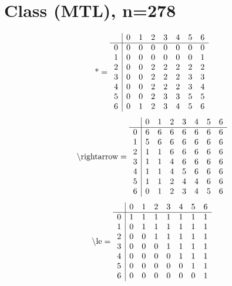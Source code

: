 \documentclass[11pt]{article}
\begin{document}
\section{Class (MTL), n=278}
\[\text{*} = 
\begin{array}{r | r r r r r r r}
 & 0 & 1 & 2 & 3 & 4 & 5 & 6 \\ \hline
0 & 0 & 0 & 0 & 0 & 0 & 0 & 0 \\
1 & 0 & 0 & 0 & 0 & 0 & 0 & 1 \\
2 & 0 & 0 & 2 & 2 & 2 & 2 & 2 \\
3 & 0 & 0 & 2 & 2 & 2 & 3 & 3 \\
4 & 0 & 0 & 2 & 2 & 2 & 3 & 4 \\
5 & 0 & 0 & 2 & 3 & 3 & 5 & 5 \\
6 & 0 & 1 & 2 & 3 & 4 & 5 & 6 \\
\end{array}
\]
\[\text{\textbackslash rightarrow} = 
\begin{array}{r | r r r r r r r}
 & 0 & 1 & 2 & 3 & 4 & 5 & 6 \\ \hline
0 & 6 & 6 & 6 & 6 & 6 & 6 & 6 \\
1 & 5 & 6 & 6 & 6 & 6 & 6 & 6 \\
2 & 1 & 1 & 6 & 6 & 6 & 6 & 6 \\
3 & 1 & 1 & 4 & 6 & 6 & 6 & 6 \\
4 & 1 & 1 & 4 & 5 & 6 & 6 & 6 \\
5 & 1 & 1 & 2 & 4 & 4 & 6 & 6 \\
6 & 0 & 1 & 2 & 3 & 4 & 5 & 6 \\
\end{array}
\]
\[\text{\textbackslash le} = 
\begin{array}{r | r r r r r r r}
 & 0 & 1 & 2 & 3 & 4 & 5 & 6 \\ \hline
0 & 1 & 1 & 1 & 1 & 1 & 1 & 1 \\
1 & 0 & 1 & 1 & 1 & 1 & 1 & 1 \\
2 & 0 & 0 & 1 & 1 & 1 & 1 & 1 \\
3 & 0 & 0 & 0 & 1 & 1 & 1 & 1 \\
4 & 0 & 0 & 0 & 0 & 1 & 1 & 1 \\
5 & 0 & 0 & 0 & 0 & 0 & 1 & 1 \\
6 & 0 & 0 & 0 & 0 & 0 & 0 & 1 \\
\end{array}
\]
\end{document}
